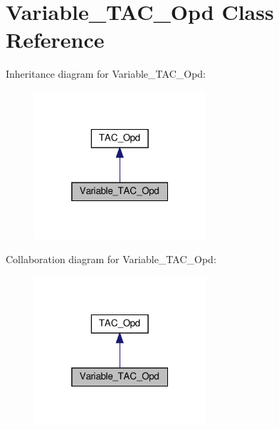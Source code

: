 \hypertarget{classVariable__TAC__Opd}{}\section{Variable\+\_\+\+T\+A\+C\+\_\+\+Opd Class Reference}
\label{classVariable__TAC__Opd}


Inheritance diagram for Variable\+\_\+\+T\+A\+C\+\_\+\+Opd\+:
\nopagebreak
\begin{figure}[H]
\begin{center}
\leavevmode
\includegraphics[width=181pt]{classVariable__TAC__Opd__inherit__graph}
\end{center}
\end{figure}


Collaboration diagram for Variable\+\_\+\+T\+A\+C\+\_\+\+Opd\+:
\nopagebreak
\begin{figure}[H]
\begin{center}
\leavevmode
\includegraphics[width=181pt]{classVariable__TAC__Opd__coll__graph}
\end{center}
\end{figure}
